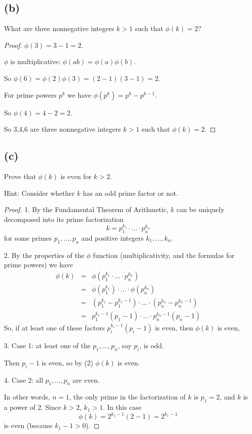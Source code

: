 \documentclass[14pt]{extarticle}
\begin{document}
\subsection{(b)}
What are three nonnegative integers $k > 1$ such that $\phi(k) = 2$?
\begin{proof}
$\phi(3) = 3-1 = 2$.

$\phi$ is multiplicative: $\phi(ab) = \phi(a) \phi(b)$. 

So $\phi(6) = \phi(2)\phi(3) = (2-1)(3-1) = 2$.

For prime powers $p^k$ we have $\phi(p^k) = p^k - p^{k-1}$.

So $\phi(4) = 4 - 2 = 2$.

So 3,4,6 are three nonnegative integers $k > 1$ such that $\phi(k) = 2$.
\end{proof}
\subsection{(c)}
Prove that $\phi(k)$ is even for $k > 2$.

Hint: Consider whether $k$ has an odd prime factor or not.
\begin{proof}
1. By the Fundamental Theorem of Arithmetic, $k$ can be uniquely decomposed into its prime factorization
$$
k = p_1^{k_1} \cdot \ldots \cdot p_n^{k_n}
$$
for some primes $p_1, \ldots, p_n$ and positive integers $k_1, \ldots, k_n$.

2. By the properties of the $\phi$ function (multiplicativity, and the formulas for prime powers) we have
$$
\begin{array}{ccc}
\phi(k) & = & \phi(p_1^{k_1} \cdot \ldots \cdot p_n^{k_n}) \\
& = & \phi(p_1^{k_1}) \cdot \ldots \cdot \phi(p_n^{k_n}) \\
& = & (p_1^{k_1} - p_1^{k_1-1}) \cdot \ldots \cdot (p_n^{k_n} - p_n^{k_n-1}) \\
& = & p_1^{k_1-1}(p_1 - 1) \cdot \ldots \cdot p_n^{k_n-1}(p_n - 1)
\end{array}
$$
So, if at least one of these factors $p_i^{k_i-1}(p_i - 1)$ is even, then $\phi(k)$ is even,

3. Case 1: at least one of the $p_1, \ldots, p_n$, say $p_i$, is odd.

Then $p_i - 1$ is even, so by (2) $\phi(k)$ is even.

4. Case 2: all $p_1, \ldots, p_n$ are even.

In other words, $n = 1$, the only prime in the factorization of $k$ is $p_1 = 2$, and $k$ is a power of 2. Since $k > 2$, $k_1 > 1$. In this case
$$
\phi(k) = 2^{k_1 - 1}(2 - 1) = 2^{k_1 - 1}
$$
is even (because $k_1 - 1 > 0$).
\end{proof}
\end{document}
